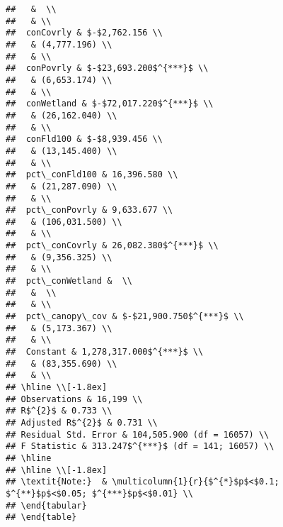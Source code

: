 \documentclass[]{article}
\begin{document}
\begin{verbatim}
##   &  \\ 
##   & \\ 
##  conCovrly & $-$2,762.156 \\ 
##   & (4,777.196) \\ 
##   & \\ 
##  conPovrly & $-$23,693.200$^{***}$ \\ 
##   & (6,653.174) \\ 
##   & \\ 
##  conWetland & $-$72,017.220$^{***}$ \\ 
##   & (26,162.040) \\ 
##   & \\ 
##  conFld100 & $-$8,939.456 \\ 
##   & (13,145.400) \\ 
##   & \\ 
##  pct\_conFld100 & 16,396.580 \\ 
##   & (21,287.090) \\ 
##   & \\ 
##  pct\_conPovrly & 9,633.677 \\ 
##   & (106,031.500) \\ 
##   & \\ 
##  pct\_conCovrly & 26,082.380$^{***}$ \\ 
##   & (9,356.325) \\ 
##   & \\ 
##  pct\_conWetland &  \\ 
##   &  \\ 
##   & \\ 
##  pct\_canopy\_cov & $-$21,900.750$^{***}$ \\ 
##   & (5,173.367) \\ 
##   & \\ 
##  Constant & 1,278,317.000$^{***}$ \\ 
##   & (83,355.690) \\ 
##   & \\ 
## \hline \\[-1.8ex] 
## Observations & 16,199 \\ 
## R$^{2}$ & 0.733 \\ 
## Adjusted R$^{2}$ & 0.731 \\ 
## Residual Std. Error & 104,505.900 (df = 16057) \\ 
## F Statistic & 313.247$^{***}$ (df = 141; 16057) \\ 
## \hline 
## \hline \\[-1.8ex] 
## \textit{Note:}  & \multicolumn{1}{r}{$^{*}$p$<$0.1; $^{**}$p$<$0.05; $^{***}$p$<$0.01} \\ 
## \end{tabular} 
## \end{table}
\end{verbatim}
\end{document}
